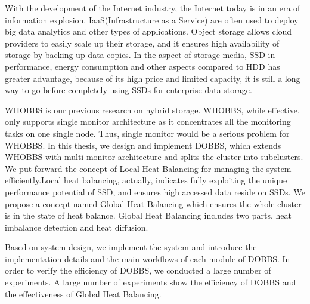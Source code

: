 \begin{englishabstract}
    With the development of the Internet industry, the Internet today is in an era of information explosion. IaaS(Infrastructure as a Service)
    are often used to deploy big data analytics and other types of applications. Object storage allows cloud providers to easily scale up their storage, 
    and it ensures high availability of storage by backing up data copies. In the aspect of storage media, SSD in performance, energy consumption and other 
    aspects compared to HDD has greater advantage, because of its high price and limited capacity, it is still a long way to go before completely using SSDs 
    for enterprise data storage.

    WHOBBS\cite{lingxuan2015whobbs} is our previous research on hybrid storage. WHOBBS, while effective, only supports single monitor architecture as it 
    concentrates all the monitoring tasks on one single node. Thus, single monitor would be a serious problem for WHOBBS. In this thesis, we design and implement
    DOBBS, which extends WHOBBS with multi-monitor architecture and splits the cluster into subclusters. We put forward the concept of Local Heat Balancing for 
    managing the system efficiently.Local heat balancing, actually, indicates fully exploiting the unique performance potential of SSD, and ensures high accessed data 
    reside on SSDs. We propose a concept named Global Heat Balancing which ensures the whole cluster is in the state of heat balance. Global Heat Balancing includes two parts,
    heat imbalance detection and heat diffusion. 

    Based on system design, we implement the system and introduce the implementation details and the main workflows of each module of DOBBS. In order to verify the efficiency of 
    DOBBS, we conducted a large number of experiments. A large number of experiments show the efficiency of DOBBS and the effectiveness of Global Heat Balancing.

\end{englishabstract}

